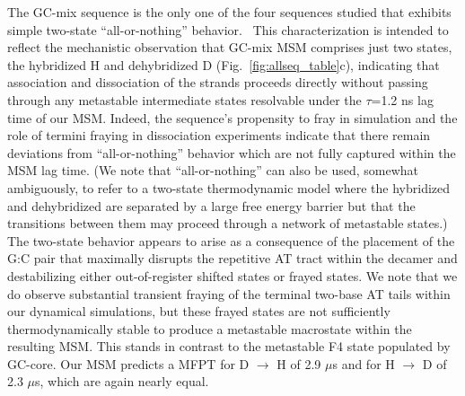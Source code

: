 \documentclass[journal=jpcbfk,manuscript=article]{achemso}
\newcommand*{\rood}[1]{{#1}}
\begin{document}
The GC-mix sequence is the only one of the four sequences studied that exhibits simple two-state ``all-or-nothing'' behavior.~\citep{Xiao2019, Araque2016LatticeCooperativity, Sikora2013ModelingIntermediates, Sanstead2016} \rood{This characterization is intended to reflect the mechanistic observation that} GC-mix MSM comprises just two states, the hybridized H and dehybridized D (Fig.~\ref{fig:allseq_table}c), indicating that association and dissociation of the strands proceeds directly without passing through any metastable intermediate states resolvable under the $\tau$=1.2 ns lag time of our MSM. \rood{Indeed, the sequence's propensity to fray in simulation and the role of termini fraying in dissociation experiments \citep{Sanstead2016} indicate that there remain deviations from ``all-or-nothing'' behavior which are not fully captured within the MSM lag time. (We note that ``all-or-nothing'' can also be used, somewhat ambiguously, to refer to a two-state thermodynamic model where the hybridized and dehybridized are separated by a large free energy barrier but that the transitions between them may proceed through a network of metastable states.)} The two-state behavior appears to arise as a consequence of the placement of the G:C pair that maximally disrupts the repetitive AT tract within the decamer and destabilizing either out-of-register shifted states or frayed states. We note that we do observe substantial transient fraying of the terminal two-base AT tails within our dynamical simulations, but these frayed states are not sufficiently thermodynamically stable to produce a metastable macrostate within the resulting MSM. This stands in contrast to the metastable F4 state populated by GC-core. Our MSM predicts a MFPT for D $\rightarrow$ H of 2.9 $\mu$s and for H $\rightarrow$ D of 2.3 $\mu$s, which are again nearly equal.
\end{document}
